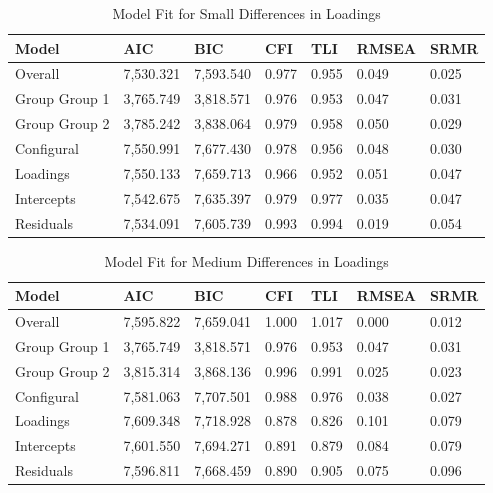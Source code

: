 \documentclass[
  man]{apa7}
\begin{document}
\begin{table}[tbp]

\begin{center}
\begin{threeparttable}

\caption{\label{tab:tab2}Model Fit for Small Differences in Loadings}

\begin{tabular}{lllllll}
\toprule
Model & AIC & BIC & CFI & TLI & RMSEA & SRMR\\
\midrule
Overall & 7,530.321 & 7,593.540 & 0.977 & 0.955 & 0.049 & 0.025\\
Group Group 1 & 3,765.749 & 3,818.571 & 0.976 & 0.953 & 0.047 & 0.031\\
Group Group 2 & 3,785.242 & 3,838.064 & 0.979 & 0.958 & 0.050 & 0.029\\
Configural & 7,550.991 & 7,677.430 & 0.978 & 0.956 & 0.048 & 0.030\\
Loadings & 7,550.133 & 7,659.713 & 0.966 & 0.952 & 0.051 & 0.047\\
Intercepts & 7,542.675 & 7,635.397 & 0.979 & 0.977 & 0.035 & 0.047\\
Residuals & 7,534.091 & 7,605.739 & 0.993 & 0.994 & 0.019 & 0.054\\
\bottomrule
\end{tabular}

\end{threeparttable}
\end{center}

\end{table}

\begin{table}[tbp]

\begin{center}
\begin{threeparttable}

\caption{\label{tab:tab3}Model Fit for Medium Differences in Loadings}

\begin{tabular}{lllllll}
\toprule
Model & AIC & BIC & CFI & TLI & RMSEA & SRMR\\
\midrule
Overall & 7,595.822 & 7,659.041 & 1.000 & 1.017 & 0.000 & 0.012\\
Group Group 1 & 3,765.749 & 3,818.571 & 0.976 & 0.953 & 0.047 & 0.031\\
Group Group 2 & 3,815.314 & 3,868.136 & 0.996 & 0.991 & 0.025 & 0.023\\
Configural & 7,581.063 & 7,707.501 & 0.988 & 0.976 & 0.038 & 0.027\\
Loadings & 7,609.348 & 7,718.928 & 0.878 & 0.826 & 0.101 & 0.079\\
Intercepts & 7,601.550 & 7,694.271 & 0.891 & 0.879 & 0.084 & 0.079\\
Residuals & 7,596.811 & 7,668.459 & 0.890 & 0.905 & 0.075 & 0.096\\
\bottomrule
\end{tabular}

\end{threeparttable}
\end{center}

\end{table}
\end{document}
